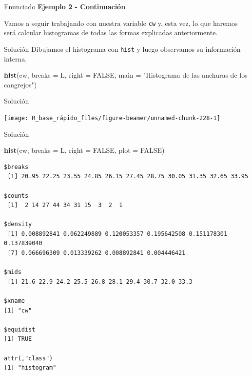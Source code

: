 \documentclass[
  ignorenonframetext,
  aspectratio=169]{beamer}
\newenvironment{Shaded}{\begin{snugshade}}{\end{snugshade}}
\newcommand{\AttributeTok}[1]{\textcolor[rgb]{0.13,0.29,0.53}{#1}}
\newcommand{\ConstantTok}[1]{\textcolor[rgb]{0.56,0.35,0.01}{#1}}
\newcommand{\FunctionTok}[1]{\textcolor[rgb]{0.13,0.29,0.53}{\textbf{#1}}}
\newcommand{\NormalTok}[1]{#1}
\newcommand{\StringTok}[1]{\textcolor[rgb]{0.31,0.60,0.02}{#1}}
\begin{document}
\begin{frame}[fragile]{Enunciado}
\label{enunciado-2}
\textbf{Ejemplo 2 - Continuación}

Vamos a seguir trabajando con nuestra variable \texttt{cw} y, esta vez,
lo que haremos será calcular histogramas de todas las formas explicadas
anteriormente.
\end{frame}

\begin{frame}[fragile]{Solución}
\label{soluciuxf3n-37}
Dibujamos el histograma con \texttt{hist} y luego observamos su
información interna.

\begin{Shaded}
\begin{Highlighting}[]
\FunctionTok{hist}\NormalTok{(cw, }\AttributeTok{breaks =}\NormalTok{ L, }\AttributeTok{right =} \ConstantTok{FALSE}\NormalTok{, }\AttributeTok{main =} \StringTok{"Histograma de las }
\StringTok{     anchuras de los cangrejos"}\NormalTok{)}
\end{Highlighting}
\end{Shaded}
\end{frame}

\begin{frame}{Solución}
\label{soluciuxf3n-38}
\begin{center}\texttt{[image: R\_base\_rápido\_files/figure-beamer/unnamed-chunk-228-1]} \end{center}
\end{frame}

\begin{frame}[fragile]{Solución}
\label{soluciuxf3n-39}
\begin{Shaded}
\begin{Highlighting}[]
\FunctionTok{hist}\NormalTok{(cw, }\AttributeTok{breaks =}\NormalTok{ L, }\AttributeTok{right =} \ConstantTok{FALSE}\NormalTok{, }\AttributeTok{plot =} \ConstantTok{FALSE}\NormalTok{)}
\end{Highlighting}
\end{Shaded}

\begin{verbatim}
$breaks
 [1] 20.95 22.25 23.55 24.85 26.15 27.45 28.75 30.05 31.35 32.65 33.95

$counts
 [1]  2 14 27 44 34 31 15  3  2  1

$density
 [1] 0.008892841 0.062249889 0.120053357 0.195642508 0.151178301 0.137839040
 [7] 0.066696309 0.013339262 0.008892841 0.004446421

$mids
 [1] 21.6 22.9 24.2 25.5 26.8 28.1 29.4 30.7 32.0 33.3

$xname
[1] "cw"

$equidist
[1] TRUE

attr(,"class")
[1] "histogram"
\end{verbatim}
\end{frame}
\end{document}

